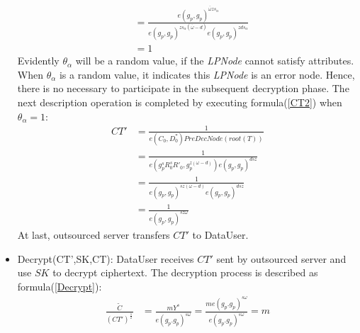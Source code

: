 \documentclass[smallextended]{svjour3}       %
\begin{document}
\begin{itemize}
\begin{equation}
\begin{split}
						  &=\frac{e(g_p,g_p)^{\bar{\omega}zs_\alpha}}{e(g_p,g_p)^{zs_\alpha (\bar{\omega}-d)} e(g_p,g_p)^{zds_\alpha}}\\
						  &=1
		\end{split}
	\end{equation}
Evidently $\theta_\alpha$ will be a random value, if the \textit{LPNode} cannot satisfy attributes. 
When $\theta_\alpha$ is a random value, it indicates this \textit{LPNode} is an error node. 
Hence, there is no necessary to participate in the subsequent decryption phase. 
The next description operation is completed by executing formula(\ref{CT2}) when $\theta_\alpha=1$:
\begin{equation}\label{CT2}
	\begin{split}
		CT' &=\frac{1}{e(C_0,D_0^*)PreDecNode(root(T))}\\
			&=\frac{1}{e(g_p^sR_0^sR'_0,g_p^{z(\omega-d)})e(g_p,g_p)^{dsz}}\\
			&=\frac{1}{e(g_p,g_p)^{sz(\omega -d)}e(g_p,g_p)^{dsz}}\\
			&=\frac{1}{e(g_p,g_p)^{sz\omega}}
	\end{split}
\end{equation}
At last, outsourced server transfers $CT'$ to DataUser.
	\item Decrypt(CT',SK,CT): DataUser receives $CT'$ sent by outsourced server and use $SK$ to decrypt ciphertext. The decryption process is described as formula(\ref{Decrypt}):
	\begin{equation}\label{Decrypt}
		\begin{split}
			\frac{\tilde{C}}{(CT')^\frac{1}{z}} &= \frac{mY^s}{e(g_p.g_p)^{s\omega}} 
												= \frac{me(g_p.g_p)^{s\omega}}{e(g_p.g_p)^{s\omega}} 
												= m
		\end{split}
	\end{equation}
\end{itemize}
 
\end{document}
